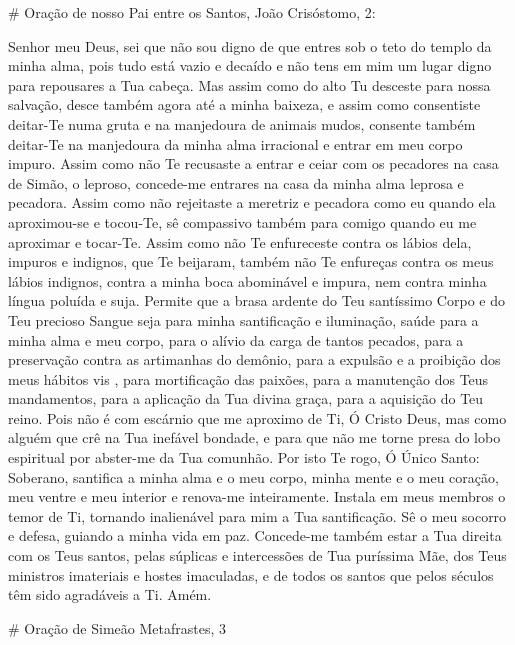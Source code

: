 \documentclass{subfiles}
\begin{document}
# Oração de nosso Pai entre os Santos, João Crisóstomo, 2:

Senhor meu Deus, sei que não sou digno de que entres sob o teto do templo da
minha alma, pois tudo está vazio e decaído e não tens em mim um lugar digno para
repousares a Tua cabeça. Mas assim como do alto Tu desceste para nossa salvação,
desce também agora até a minha baixeza, e assim como consentiste deitar-Te numa
gruta e na manjedoura de animais mudos, consente também deitar-Te na manjedoura
da minha alma irracional e entrar em meu corpo impuro. Assim como não Te
recusaste a entrar e ceiar com os pecadores na casa de Simão, o leproso,
concede-me entrares na casa da minha alma leprosa e pecadora. Assim como não
rejeitaste a meretriz e pecadora como eu quando ela aproximou-se e tocou-Te, sê
compassivo também para comigo quando eu me aproximar e tocar-Te. Assim como não
Te enfureceste contra os lábios dela, impuros e indignos, que Te beijaram,
também não Te enfureças contra os meus lábios indignos, contra a minha boca
abominável e impura, nem contra minha língua poluída e suja. Permite que a brasa
ardente do Teu santíssimo Corpo e do Teu precioso Sangue seja para minha
santificação e iluminação, saúde para a minha alma e meu corpo, para o alívio da
carga de tantos pecados, para a preservação contra as artimanhas do demônio,
para a expulsão e a proibição dos meus hábitos vis , para mortificação das
paixões, para a manutenção dos Teus mandamentos, para a aplicação da Tua divina
graça, para a aquisição do Teu reino. Pois não é com escárnio que me aproximo de
Ti, Ó Cristo Deus, mas como alguém que crê na Tua inefável bondade, e para que
não me torne presa do lobo espiritual por abster-me da Tua comunhão. Por isto Te
rogo, Ó Único Santo: Soberano, santifica a minha alma e o meu corpo, minha mente
e o meu coração, meu ventre e meu interior e renova-me inteiramente. Instala em
meus membros o temor de Ti, tornando inalienável para mim a Tua santificação. Sê
o meu socorro e defesa, guiando a minha vida em paz. Concede-me também estar a
Tua direita com os Teus santos, pelas súplicas e intercessões de Tua puríssima
Mãe, dos Teus ministros imateriais e hostes imaculadas, e de todos os santos que
pelos séculos têm sido agradáveis a Ti. Amém.

# Oração de Simeão Metafrastes, 3
\end{document}
